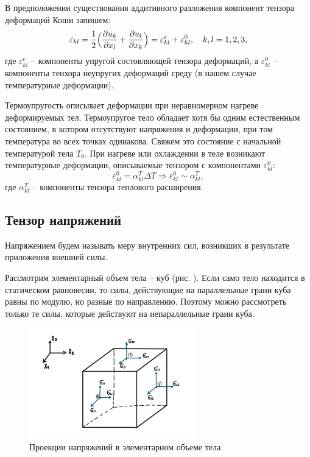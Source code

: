 \documentclass[12pt,a4paper]{article}
\begin{document}
    В предположении существования аддитивного разложения компонент тензора деформаций Коши запишем:
    \[
      \varepsilon_{kl} = \dfrac{1}{2}\Bigl( \dfrac{\partial u_k}{\partial x_l} + \dfrac{\partial u_l}{\partial x_k} \Bigr) = \varepsilon_{kl}^e +  \varepsilon_{kl}^0, \quad k, l = 1, 2, 3,
    \]
    \noindent где $\varepsilon_{kl}^e$ -- компоненты упругой состовляющей тензора деформаций, а $ \varepsilon_{kl}^0 $ -- компоненты тенхора неупругих деформаций среду (в нашем случае температурные деформации).
    
    Термоупругость описывает деформации при неравномерном нагреве деформируемых тел. Термоупругое тело обладает хотя бы одним естественным состоянием, в котором отсутствуют напряжения и деформации, при том температура во всех точках одинакова. Свяжем это состояние с начальной температурой тела $T_0$. При нагреве или охлаждении в теле возникают температурные деформации, описываемые тензором с компонентами $ \varepsilon_{kl}^0 \colon$
    \[
      \varepsilon_{kl}^0 = \alpha_{kl}^T \Delta T \Rightarrow \varepsilon_{kl}^0 \sim \alpha_{kl}^T,
    \]
    \noindent где $ \alpha_{kl}^T $ -- компоненты тензора теплового расширения.

    \subsection{Тензор напряжений}

    Напряжением будем называть меру внутренних сил, возникших в результате приложения внешней силы. 

    Рассмотрим элементарный объем тела -- куб (рис. ). Если само тело находится в статическом равновесии, то силы, действующие на параллельные грани куба равны по модулю, но разные по направлению. Поэтому можно рассмотреть только те силы, которые действуют на непараллельные грани куба.

    \pagebreak

    \begin{figure}[h]
      \centering
      \includegraphics[width=0.65\textwidth]{cube.jpeg}
      \caption{Проекции напряжений в элементарном объеме тела}
      \label{fig:cube}
    \end{figure}
\end{document}
